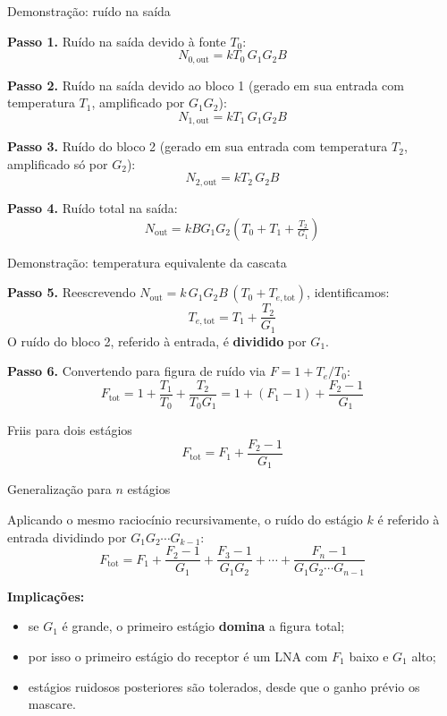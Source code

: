 
\begin{frame}{Demonstração: ruído na saída}

\textbf{Passo 1.} Ruído na saída devido à fonte $T_0$:
\[
N_{0,\text{out}} = k T_0\, G_1 G_2 B
\]

\textbf{Passo 2.} Ruído na saída devido ao bloco 1 (gerado em sua entrada com temperatura $T_1$, amplificado por $G_1 G_2$):
\[
N_{1,\text{out}} = k T_1\, G_1 G_2 B
\]

\textbf{Passo 3.} Ruído do bloco 2 (gerado em sua entrada com temperatura $T_2$, amplificado só por $G_2$):
\[
N_{2,\text{out}} = k T_2\, G_2 B
\]

\textbf{Passo 4.} Ruído total na saída:
\[
N_{\text{out}} = k B G_1 G_2 \left( T_0 + T_1 + \tfrac{T_2}{G_1} \right)
\]

\end{frame}


\begin{frame}{Demonstração: temperatura equivalente da cascata}

\textbf{Passo 5.} Reescrevendo $N_{\text{out}} = k\, G_1 G_2 B\, (T_0 + T_{e,\text{tot}})$, identificamos:
\[
\boxed{T_{e,\text{tot}} = T_1 + \frac{T_2}{G_1}}
\]
O ruído do bloco 2, referido à entrada, é \textbf{dividido} por $G_1$.

\textbf{Passo 6.} Convertendo para figura de ruído via $F = 1 + T_e/T_0$:
\[
F_{\text{tot}} = 1 + \frac{T_1}{T_0} + \frac{T_2}{T_0 G_1} = 1 + (F_1 - 1) + \frac{F_2 - 1}{G_1}
\]

\begin{block}{Friis para dois estágios}
\[
F_{\text{tot}} = F_1 + \frac{F_2 - 1}{G_1}
\]
\end{block}

\end{frame}


\begin{frame}{Generalização para $n$ estágios}

Aplicando o mesmo raciocínio recursivamente, o ruído do estágio $k$ é referido à entrada dividindo por $G_1 G_2 \cdots G_{k-1}$:
\[
\boxed{F_{\text{tot}} = F_1 + \frac{F_2 - 1}{G_1} + \frac{F_3 - 1}{G_1 G_2} + \cdots + \frac{F_n - 1}{G_1 G_2 \cdots G_{n-1}}}
\]

\textbf{Implicações:}
\begin{itemize}
\item se $G_1$ é grande, o primeiro estágio \textbf{domina} a figura total;
\item por isso o primeiro estágio do receptor é um LNA com $F_1$ baixo e $G_1$ alto;
\item estágios ruidosos posteriores são tolerados, desde que o ganho prévio os mascare.
\end{itemize}

\end{frame}

